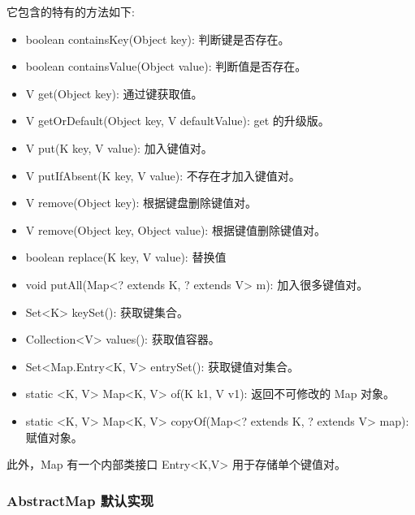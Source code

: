 它包含的特有的方法如下:
\begin{itemize}
    \item boolean containsKey(Object key): 判断键是否存在。
    \item boolean containsValue(Object value): 判断值是否存在。
    \item V get(Object key): 通过键获取值。
    \item V getOrDefault(Object key, V defaultValue): get 的升级版。
    \item V put(K key, V value): 加入键值对。
    \item V putIfAbsent(K key, V value): 不存在才加入键值对。
    \item V remove(Object key): 根据键盘删除键值对。
    \item V remove(Object key, Object value): 根据键值删除键值对。
    \item boolean replace(K key, V value): 替换值
    \item void putAll(Map<? extends K, ? extends V> m): 加入很多键值对。
    \item Set<K> keySet(): 获取键集合。
    \item Collection<V> values(): 获取值容器。
    \item Set<Map.Entry<K, V> entrySet(): 获取键值对集合。
    \item static <K, V> Map<K, V> of(K k1, V v1): 返回不可修改的 Map 对象。
    \item static <K, V> Map<K, V> copyOf(Map<? extends K, ? extends V> map): 赋值对象。
\end{itemize}

此外，Map 有一个内部类接口 Entry<K,V> 用于存储单个键值对。

\subsubsection{AbstractMap 默认实现}




\newpage